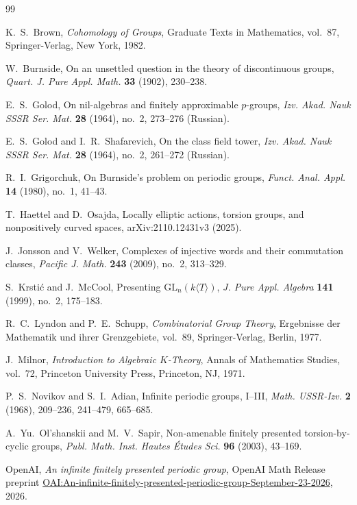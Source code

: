 \begin{thebibliography}{99}

K.~S.~Brown,
\emph{Cohomology of Groups},
Graduate Texts in Mathematics, vol.~87,
Springer-Verlag, New York, 1982.

W.~Burnside,
On an unsettled question in the theory of discontinuous groups,
\emph{Quart. J. Pure Appl. Math.} \textbf{33} (1902), 230--238.

E.~S.~Golod,
On nil-algebras and finitely approximable $p$-groups,
\emph{Izv. Akad. Nauk SSSR Ser. Mat.} \textbf{28} (1964), no.~2,
273--276 (Russian).

E.~S.~Golod and I.~R.~Shafarevich,
On the class field tower,
\emph{Izv. Akad. Nauk SSSR Ser. Mat.} \textbf{28} (1964), no.~2,
261--272 (Russian).

R.~I.~Grigorchuk,
On Burnside's problem on periodic groups,
\emph{Funct. Anal. Appl.} \textbf{14} (1980), no.~1, 41--43.

T.~Haettel and D.~Osajda,
Locally elliptic actions, torsion groups, and nonpositively curved spaces,
arXiv:2110.12431v3 (2025).

J.~Jonsson and V.~Welker,
Complexes of injective words and their commutation classes,
\emph{Pacific J. Math.} \textbf{243} (2009), no.~2, 313--329.

S.~Krsti\'c and J.~McCool,
Presenting $\mathrm{GL}_n(k\langle T\rangle)$,
\emph{J. Pure Appl. Algebra} \textbf{141} (1999), no.~2, 175--183.

R.~C.~Lyndon and P.~E.~Schupp,
\emph{Combinatorial Group Theory},
Ergebnisse der Mathematik und ihrer Grenzgebiete, vol.~89,
Springer-Verlag, Berlin, 1977.

J.~Milnor,
\emph{Introduction to Algebraic $K$-Theory},
Annals of Mathematics Studies, vol.~72,
Princeton University Press, Princeton, NJ, 1971.

P.~S.~Novikov and S.~I.~Adian,
Infinite periodic groups, I--III,
\emph{Math. USSR-Izv.} \textbf{2} (1968),
209--236, 241--479, 665--685.

A.~Yu.~Ol'shanskii and M.~V.~Sapir,
Non-amenable finitely presented torsion-by-cyclic groups,
\emph{Publ. Math. Inst. Hautes \'Etudes Sci.} \textbf{96} (2003), 43--169.

OpenAI,
\emph{An infinite finitely presented periodic group},
OpenAI Math Release preprint
\href{https://github.com/openai/math/blob/main/preprints/An-infinite-finitely-presented-periodic-group-September-23-2026/paper.pdf}{OAI:An-infinite-finitely-presented-periodic-group-September-23-2026},
2026.


\end{thebibliography}
